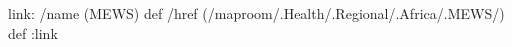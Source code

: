 \begin{ingrid}
link:
/name (MEWS) def
/href (/maproom/.Health/.Regional/.Africa/.MEWS/) def
:link
\end{ingrid}